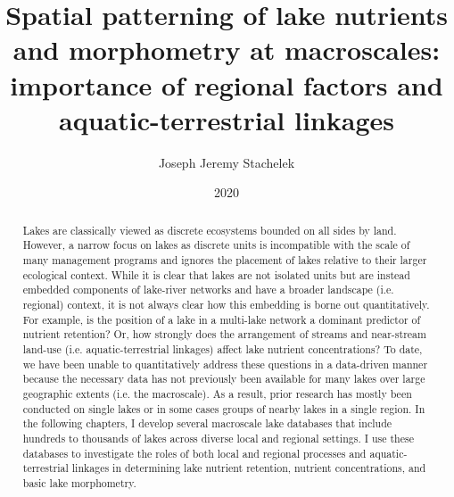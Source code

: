 \documentclass[]{msu-thesis}
\title{Spatial patterning of lake nutrients and morphometry at macroscales: importance of regional factors and aquatic-terrestrial linkages}
\author{Joseph Jeremy Stachelek}
\date{2020}
\theoremstyle{definition}
\theoremstyle{definition}
\theoremstyle{definition}
\theoremstyle{remark}
\begin{document}

\maketitlepage
\begin{abstract}
Lakes are classically viewed as discrete ecosystems bounded on all sides by land. However, a narrow focus on lakes as discrete units is incompatible with the scale of many management programs and ignores the placement of lakes relative to their larger ecological context. While it is clear that lakes are not isolated units but are instead embedded components of lake-river networks and have a broader landscape (i.e. regional) context, it is not always clear how this embedding is borne out quantitatively. For example, is the position of a lake in a multi-lake network a dominant predictor of nutrient retention? Or, how strongly does the arrangement of streams and near-stream land-use (i.e. aquatic-terrestrial linkages) affect lake nutrient concentrations? To date, we have been unable to quantitatively address these questions in a data-driven manner because the necessary data has not previously been available for many lakes over large geographic extents (i.e. the macroscale). As a result, prior research has mostly been conducted on single lakes or in some cases groups of nearby lakes in a single region. In the following chapters, I develop several macroscale lake databases that include hundreds to thousands of lakes across diverse local and regional settings. I use these databases to investigate the roles of both local and regional processes and aquatic-terrestrial linkages in determining lake nutrient retention, nutrient concentrations, and basic lake morphometry.


\end{abstract}
\end{document}

